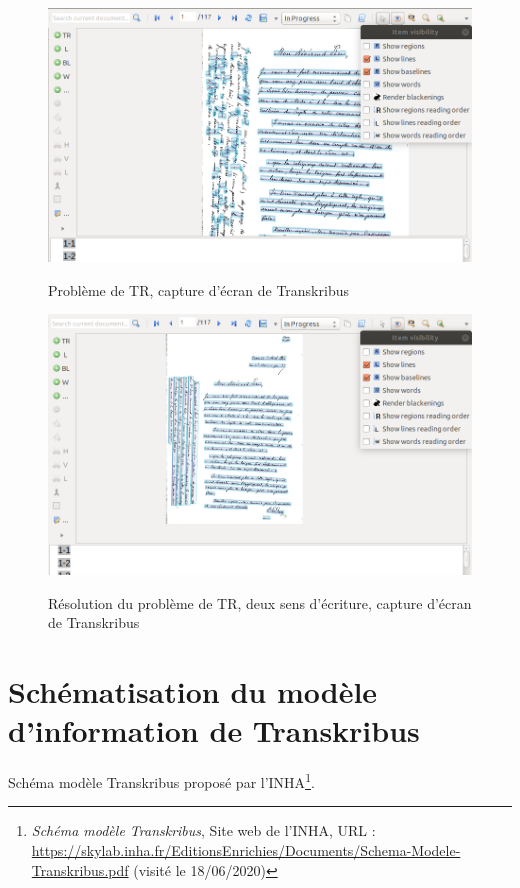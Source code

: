 \begin{figure}[H]
    \centering
    \caption{Problème de TR, capture d'écran de Transkribus}
    \includegraphics[width=14cm]{images/trTranskribus.png}
    \label{trTranskribus}
\end{figure}

\begin{figure}[H]
    \centering
    \caption{Résolution du problème de TR, deux sens d'écriture, capture d'écran de Transkribus}
    \includegraphics[width=14cm]{images/trCorTranskribus.png}
    \label{trCorTranskribus}
\end{figure}

\section{Schématisation du modèle d’information de Transkribus}

Schéma modèle Transkribus proposé par l'INHA\footnote{\emph{Schéma modèle Transkribus}, Site web de l'INHA, URL : \url{https://skylab.inha.fr/EditionsEnrichies/Documents/Schema-Modele-Transkribus.pdf} (visité le 18/06/2020)}.

